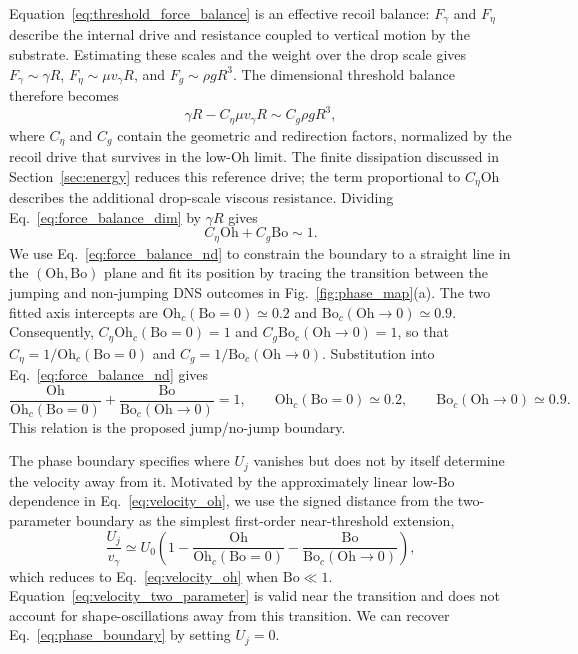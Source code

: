 \documentclass[
reprint,
amsmath,amssymb,
superscriptaddress,
onecolumn,
aps,
prfluids,
longbibliography,
floatfix
]{revtex4-2}
\newcommand{\Oh}{\mathrm{Oh}}
\newcommand{\Bo}{\mathrm{Bo}}
\newcommand{\vgamma}{v_\gamma}
\begin{document}
Equation~\eqref{eq:threshold_force_balance} is an effective recoil balance: $F_\gamma$ and $F_\eta$ describe the internal drive and resistance coupled to vertical motion by the substrate. Estimating these scales and the weight over the drop scale gives $F_\gamma\sim\gamma R$, $F_\eta\sim\mu\vgamma R$, and $F_g\sim\rho gR^3$. The dimensional threshold balance therefore becomes
\begin{equation}
    \gamma R - C_\eta \mu\vgamma R \sim C_g \rho gR^3,
    \label{eq:force_balance_dim}
\end{equation}
where $C_\eta$ and $C_g$ contain the geometric and redirection factors, normalized by the recoil drive that survives in the low-$\Oh$ limit. The finite dissipation discussed in Section~\ref{sec:energy} reduces this reference drive; the term proportional to $C_\eta\Oh$ describes the additional drop-scale viscous resistance. Dividing Eq.~\eqref{eq:force_balance_dim} by $\gamma R$ gives
\begin{equation}
    C_\eta \Oh + C_g \Bo \sim 1.
    \label{eq:force_balance_nd}
\end{equation}
We use Eq.~\eqref{eq:force_balance_nd} to constrain the boundary to a straight line in the $(\Oh,\Bo)$ plane and fit its position by tracing the transition between the jumping and non-jumping DNS outcomes in Fig.~\ref{fig:phase_map}(a). The two fitted axis intercepts are $\Oh_c(\Bo=0)\simeq0.2$ and $\Bo_c(\Oh\to 0)\simeq0.9$. Consequently, $C_\eta\Oh_c(\Bo=0)=1$ and $C_g\Bo_c(\Oh\to 0)=1$, so that $C_\eta=1/\Oh_c(\Bo=0)$ and $C_g=1/\Bo_c(\Oh\to 0)$. Substitution into Eq.~\eqref{eq:force_balance_nd} gives
\begin{equation}
    \frac{\Oh}{\Oh_c(\Bo=0)}+\frac{\Bo}{\Bo_c(\Oh\to 0)}=1,
    \qquad \Oh_c(\Bo=0)\simeq0.2, \qquad \Bo_c(\Oh\to 0)\simeq0.9.
    \label{eq:phase_boundary}
\end{equation}
This relation is the proposed jump/no-jump boundary.

The phase boundary specifies where $U_j$ vanishes but does not by itself determine the velocity away from it. Motivated by the approximately linear low-$\Bo$ dependence in Eq.~\eqref{eq:velocity_oh}, we use the signed distance from the two-parameter boundary as the simplest first-order near-threshold extension,
\begin{equation}
    \frac{U_j}{\vgamma}\simeq U_0\left(1-\frac{\Oh}{\Oh_c(\Bo=0)}-\frac{\Bo}{\Bo_c(\Oh\to 0)}\right),
    \label{eq:velocity_two_parameter}
\end{equation}
which reduces to Eq.~\eqref{eq:velocity_oh} when $\Bo\ll1$. Equation~\eqref{eq:velocity_two_parameter} is valid near the transition and does not account for shape-oscillations away from this transition. We can recover Eq.~\eqref{eq:phase_boundary} by setting $U_j=0$.
\end{document}
